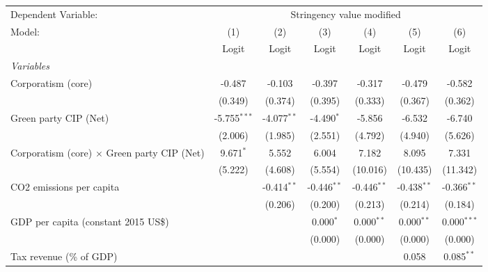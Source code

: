 
\begingroup
\centering
\begin{tabular}{lcccccc}
   \toprule
   Dependent Variable: & \multicolumn{6}{c}{Stringency value modified}\\
   Model:                                             & (1)            & (2)           & (3)           & (4)           & (5)           & (6)\\  
                                                      &  Logit         & Logit         & Logit         & Logit         & Logit         & Logit\\  
   \midrule
   \emph{Variables}\\
   Corporatism (core)                                 & -0.487         & -0.103        & -0.397        & -0.317        & -0.479        & -0.582\\   
                                                      & (0.349)        & (0.374)       & (0.395)       & (0.333)       & (0.367)       & (0.362)\\   
   Green party CIP (Net)                              & -5.755$^{***}$ & -4.077$^{**}$ & -4.490$^{*}$  & -5.856        & -6.532        & -6.740\\   
                                                      & (2.006)        & (1.985)       & (2.551)       & (4.792)       & (4.940)       & (5.626)\\   
   Corporatism (core) $\times$ Green party CIP (Net)  & 9.671$^{*}$    & 5.552         & 6.004         & 7.182         & 8.095         & 7.331\\   
                                                      & (5.222)        & (4.608)       & (5.554)       & (10.016)      & (10.435)      & (11.342)\\   
   CO2 emissions per capita                           &                & -0.414$^{**}$ & -0.446$^{**}$ & -0.446$^{**}$ & -0.438$^{**}$ & -0.366$^{**}$\\   
                                                      &                & (0.206)       & (0.200)       & (0.213)       & (0.214)       & (0.184)\\   
   GDP per capita (constant 2015 US\$)                &                &               & 0.000$^{*}$   & 0.000$^{**}$  & 0.000$^{**}$  & 0.000$^{***}$\\   
                                                      &                &               & (0.000)       & (0.000)       & (0.000)       & (0.000)\\   
   Tax revenue (\% of GDP)                            &                &               &               &               & 0.058         & 0.085$^{**}$\\   

\end{tabular}
